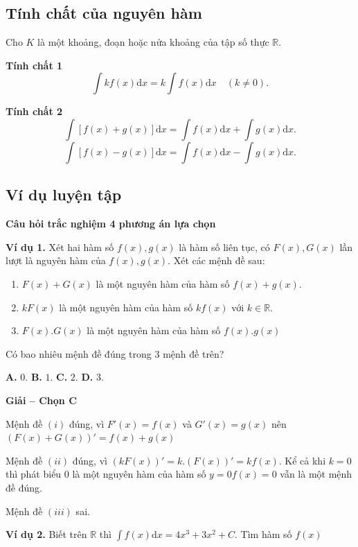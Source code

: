 \documentclass[12pt,a4paper,oneside]{book}
\theoremstyle{theorem}
\theoremstyle{definition}
\begin{document}
 \subsection{Tính chất của nguyên hàm}

\noindent Cho $K$ là một khoảng, đoạn hoặc nửa khoảng của tập số thực $\mathbb{R}$.

\noindent\textbf{Tính chất 1}
\[
\int k f(x)\mathrm{d}x = k \int f(x)\mathrm{d}x \quad (k \neq 0).
\]

\noindent\textbf{Tính chất 2}
\[
\int [f(x) + g(x)]\mathrm{d}x = \int f(x)\mathrm{d}x + \int g(x)\mathrm{d}x.
\]
\[
\int [f(x) - g(x)]\mathrm{d}x = \int f(x)\mathrm{d}x - \int g(x)\mathrm{d}x.
\]
\subsection{Ví dụ luyện tập}
\noindent \textbf{Câu hỏi trắc nghiệm 4 phương án lựa chọn}

\noindent \textbf{Ví dụ 1.} Xét hai hàm số $f(x), g(x)$ là hàm số liên tục, có $F(x), G(x)$ lần lượt là nguyên hàm của $f(x), g(x)$. Xét các mệnh đề sau:
\begin{enumerate}
    \item[(i)] $F(x) + G(x)$ là một nguyên hàm của hàm số $f(x) + g(x)$.
    \item[(ii)] $kF(x)$ là một nguyên hàm của hàm số $kf(x)$ với $k \in \mathbb{R}$.
    \item[(iii)] $F(x).G(x)$ là một nguyên hàm của hàm số $f(x).g(x)$
\end{enumerate}

\noindent Có bao nhiêu mệnh đề đúng trong 3 mệnh đề trên?

\noindent \textbf{A.} $0$.
\hfill \textbf{B.} $1$.
\hfill \textbf{C.} $2$. 
\hfill \textbf{D.} $3$.

\noindent \hspace*{3cm}\textbf{Giải -- Chọn C}

\noindent Mệnh đề $(i)$ đúng, vì $F'(x) = f(x)$ và $G'(x) = g(x)$ nên $(F(x) + G(x))' = f(x) + g(x)$

\noindent Mệnh đề $(ii)$ đúng, vì $(kF(x))' = k.(F(x))' = kf(x)$. Kể cả khi $k = 0$ thì phát biểu $0$ là một nguyên hàm của hàm số $y = 0f(x) = 0$ vẫn là một mệnh đề đúng.

\noindent Mệnh đề $(iii)$ sai.

\noindent \textbf{Ví dụ 2.} Biết trên $\mathbb{R}$ thì $\int f(x)\mathrm{d}x = 4x^3 + 3x^2 + C$. Tìm hàm số $f(x)$
\end{document}
